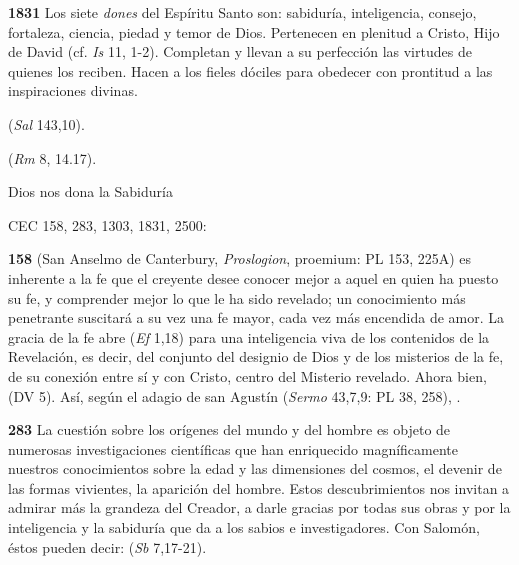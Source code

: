 \textbf{1831} Los siete \emph{dones} del Espíritu Santo son: sabiduría, inteligencia, consejo, fortaleza, ciencia, piedad y temor de Dios. Pertenecen en plenitud a Cristo, Hijo de David (cf. \emph{Is} 11, 1-2). Completan y llevan a su perfección las virtudes de quienes los reciben. Hacen a los fieles dóciles para obedecer con prontitud a las inspiraciones divinas.

 (\emph{Sal} 143,10).

 (\emph{Rm} 8, 14.17).

Dios nos dona la Sabiduría

CEC 158, 283, 1303, 1831, 2500:

\textbf{158}  (San Anselmo de Canterbury, \emph{Proslogion}, proemium: PL 153, 225A) es inherente a la fe que el creyente desee conocer mejor a aquel en quien ha puesto su fe, y comprender mejor lo que le ha sido revelado; un conocimiento más penetrante suscitará a su vez una fe mayor, cada vez más encendida de amor. La gracia de la fe abre  (\emph{Ef} 1,18) para una inteligencia viva de los contenidos de la Revelación, es decir, del conjunto del designio de Dios y de los misterios de la fe, de su conexión entre sí y con Cristo, centro del Misterio revelado. Ahora bien,  (DV 5). Así, según el adagio de san Agustín (\emph{Sermo} 43,7,9: PL 38, 258), .

\textbf{283} La cuestión sobre los orígenes del mundo y del hombre es objeto de numerosas investigaciones científicas que han enriquecido magníficamente nuestros conocimientos sobre la edad y las dimensiones del cosmos, el devenir de las formas vivientes, la aparición del hombre. Estos descubrimientos nos invitan a admirar más la grandeza del Creador, a darle gracias por todas sus obras y por la inteligencia y la sabiduría que da a los sabios e investigadores. Con Salomón, éstos pueden decir:  (\emph{Sb} 7,17-21).

